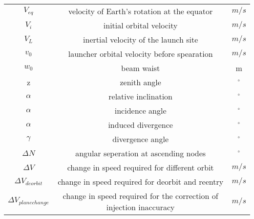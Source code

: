 \begin{center}
\begin{longtable}{c|c|c}
$V_{eq}$                            & velocity of Earth's rotation at the equator 														& $m/s$ \\

$V_i$                               & initial orbital velocity      																					& $m/s$ \\

$V_L$                               & inertial velocity of the launch site        														& $m/s$ \\

$v_0$                               & launcher orbital velocity before spearation 														& $m/s$ \\

$w_0$                       				& beam waist                                      												& m \\

z                             			& zenith angle                                  													& $^\circ$ \\     
 
$\alpha$                            & relative inclination                        														& $^\circ$ \\

$\alpha$                            & incidence angle                        																	& $^\circ$ \\

$\alpha$                            & induced divergence                       																& $^\circ$ \\

$\gamma$                            & divergence angle                         																& $^\circ$ \\

$\Delta N$                          & angular seperation at ascending nodes            												& $^\circ$ \\   

$\Delta V$                          & change in speed required for different orbit 														& $m/s$ \\

$\Delta V_{deorbit}$                & change in speed required for deorbit and reentry  											& $m/s$ \\ 

$\Delta V_{planechange}$            & change in speed required for the correction of injection inaccuracy			& $m/s$ \\ 


\end{longtable}
\end{center}

